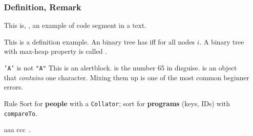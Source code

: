 \documentclass[aspectratio=169,10pt,compress]{beamer}
\begin{document}
\begin{frame}[t]\frametitle{Definition, Remark}

	This is, , an example of code segment in a text.
	
	\begin{definition}
		This is a definition example.
		An binary tree   has   
		iff
		 for all nodes $i$.
		A binary tree with max-heap property is called .
	\end{definition}
	\begin{alertblock}{\texttt{'A'} is not \texttt{"A"}}
		This is an alertblock.
		 is the number 65 in disguise. 
		 is an object that \emph{contains} one character.
		Mixing them up is one of the most common beginner errors.
	\end{alertblock}	
	
	\begin{alertblock}{Rule}
		\small Sort for \textbf{people} with a \texttt{Collator};
		sort for \textbf{programs} (keys, IDs) with \texttt{compareTo}.
	\end{alertblock}

	aaa  ccc~\cite{cormen2022introduction}.

\end{frame}
\end{document}
